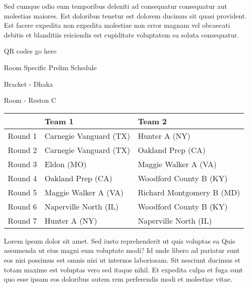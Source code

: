 \documentclass{article}%
\begin{document}
\newline%
Sed cumque odio eum temporibus deleniti ad consequatur consequatur aut molestias maiores. Est doloribus tenetur est dolorem ducimus sit quasi provident. Est facere expedita non expedita molestiae non error magnam vel obcaecati debitis et blanditiis reiciendis est cupiditate voluptatem ea soluta consequatur.%
\vspace*{140pt}%
\begin{center}%
\begin{Huge}%
QR codes go here%
\end{Huge}%
\end{center}%
\newpage%
\begin{center}%
\begin{Huge}%
Room Specific Prelim Schedule%
\end{Huge}%
\vspace*{8pt}%
\linebreak%
\begin{Large}%
Bracket {-} Dhaka%
\end{Large}%
\vspace*{8pt}%
\linebreak%
\vspace*{8pt}%
\begin{Large}%
Room {-} Reston C%
\end{Large}%
\end{center}%
%
\begin{tabularx}{\textwidth}{|c|Y|Y|}%
\hline%
&Team 1&Team 2\\%
\hline%
Round 1&Carnegie Vanguard (TX)&Hunter A (NY)\\%
Round 2&Carnegie Vanguard (TX)&Oakland Prep (CA)\\%
Round 3&Eldon (MO)&Maggie Walker A (VA)\\%
Round 4&Oakland Prep (CA)&Woodford County B (KY)\\%
Round 5&Maggie Walker A (VA)&Richard Montgomery B (MD)\\%
Round 6&Naperville North (IL)&Woodford County B (KY)\\%
Round 7&Hunter A (NY)&Naperville North (IL)\\%
\hline%
\end{tabularx}%
\vspace*{8pt}%
\newline%
Lorem ipsum dolor sit amet. Sed iusto reprehenderit ut quis voluptas ea Quis assumenda ut eius magni eum voluptate modi? Id unde libero ad pariatur sunt eos nisi possimus est omnis nisi ut internos laboriosam. Sit nesciunt ducimus et totam maxime est voluptas vero sed itaque nihil. Et expedita culpa et fuga sunt quo esse ipsam eos doloribus autem rem perferendis modi et molestiae vitae.\newline%
\end{document}
